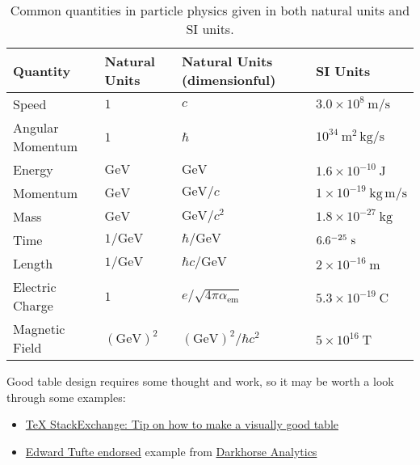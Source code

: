 \begin{table}[htpb]
 \centering
 \caption[Common quantities in particle physics in natural and SI units.]{%
  Common quantities in particle physics given in both natural units and SI units.}
 \begin{tabular}{@{}llll@{}} \toprule
  Quantity         & Natural Units                 & Natural Units (dimensionful)            & SI Units                                              \\ \midrule
  Speed            & $1$                           & $c$                                     & $3.0\times 10^{8}~\mathrm{m}/\mathrm{s}$              \\
  Angular Momentum & $1$                           & $\hbar$                                 & $10^{34}~\mathrm{m}^2 \,\mathrm{kg}/\mathrm{s}$       \\
  Energy           & $\mathrm{GeV}$                & $\mathrm{GeV}$                          & $1.6\times 10^{-10}~\mathrm{J}$                       \\
  Momentum         & $\mathrm{GeV}$                & $\mathrm{GeV}/c$                        & $1\times 10^{-19}~\mathrm{kg}\,\mathrm{m}/\mathrm{s}$ \\
  Mass             & $\mathrm{GeV}$                & $\mathrm{GeV}/c^{2}$                    & $1.8\times 10^{-27}~\mathrm{kg}$                      \\
  Time             & $1/\mathrm{GeV}$              & $\hbar/\mathrm{GeV}$                    & $6.6\time 10^{-25}~\mathrm{s}$                        \\
  Length           & $1/\mathrm{GeV}$              & $\hbar c/\mathrm{GeV}$                  & $2\times 10^{-16}~\mathrm{m}$                         \\
  Electric Charge  & $1$                           & $e/\sqrt{4\pi \alpha_{\mathrm{em}}}$    & $5.3\times 10^{-19}~\mathrm{C}$                       \\
  Magnetic Field   & $\left(\mathrm{GeV}\right)^2$ & $\left(\mathrm{GeV}\right)^2/\hbar c^2$ & $5\times 10^{16}~\mathrm{T}$                          \\
  \bottomrule
 \end{tabular}\label{table:natural_units}%
\end{table}

Good table design requires some thought and work, so it may be worth a look through some examples:
\begin{itemize}
 \item \href{https://tex.stackexchange.com/questions/238503/tip-on-how-to-make-a-visually-good-table}{TeX StackExchange: Tip on how to make a visually good table}
 \item \href{https://twitter.com/edwardtufte/status/451820483109847040?lang=en}{Edward Tufte endorsed} example from \href{http://static1.squarespace.com/static/56713bf4dc5cb41142f28d1f/t/56fd4c83746fb9261146eed5/1459440776291/ClearOffTheTableMd.gif}{Darkhorse Analytics}
\end{itemize}

